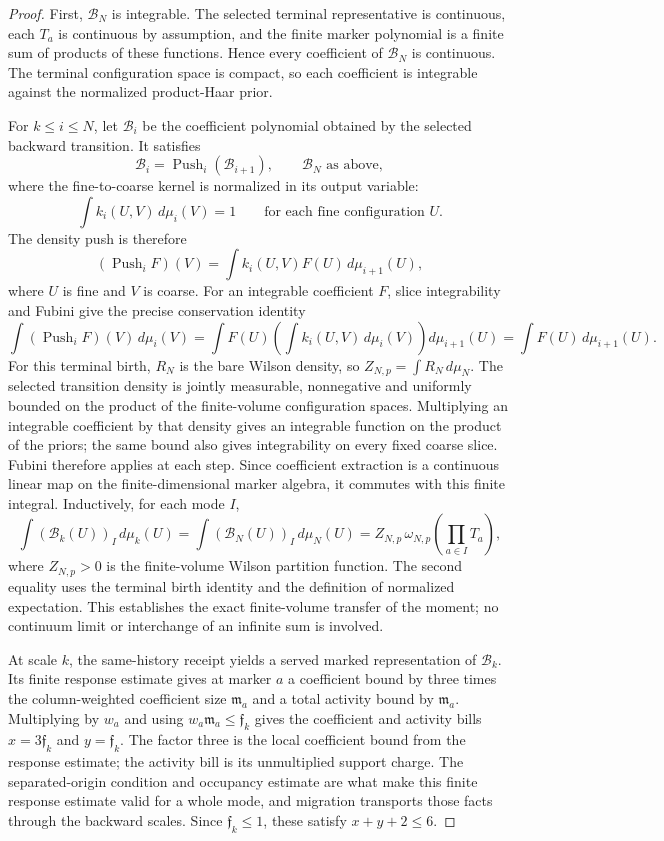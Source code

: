 \begin{proof}
First, $\mathcal B_N$ is integrable. The selected terminal representative is continuous, each $T_a$ is continuous by assumption, and the finite marker polynomial is a finite sum of products of these functions. Hence every coefficient of $\mathcal B_N$ is continuous. The terminal configuration space is compact, so each coefficient is integrable against the normalized product-Haar prior.

For $k\leq i\leq N$, let $\mathcal B_i$ be the coefficient polynomial obtained by the selected backward transition. It satisfies
\[
 \mathcal B_i=\operatorname{Push}_i(\mathcal B_{i+1}),
 \qquad \mathcal B_N\text{ as above},
\]
where the fine-to-coarse kernel is normalized in its output variable:
\[
 \int k_i(U,V)\,d\mu_i(V)=1\qquad\text{for each fine configuration }U.
\]
The density push is therefore
\[
 (\operatorname{Push}_iF)(V)=\int k_i(U,V)F(U)\,d\mu_{i+1}(U),
\]
where $U$ is fine and $V$ is coarse. For an integrable coefficient $F$, slice integrability and Fubini give the precise conservation identity
\[
 \int (\operatorname{Push}_iF)(V)\,d\mu_i(V)
 =\int F(U)\left(\int k_i(U,V)\,d\mu_i(V)\right)d\mu_{i+1}(U)
 =\int F(U)\,d\mu_{i+1}(U).
\]
For this terminal birth, $R_N$ is the bare Wilson density, so $Z_{N,p}=\int R_N\,d\mu_N$. The selected transition density is jointly measurable, nonnegative and uniformly bounded on the product of the finite-volume configuration spaces. Multiplying an integrable coefficient by that density gives an integrable function on the product of the priors; the same bound also gives integrability on every fixed coarse slice. Fubini therefore applies at each step. Since coefficient extraction is a continuous linear map on the finite-dimensional marker algebra, it commutes with this finite integral. Inductively, for each mode $I$,
\[
 \int (\mathcal B_k(U))_I\,d\mu_k(U)
 =\int (\mathcal B_N(U))_I\,d\mu_N(U)
 =Z_{N,p}\,\omega_{N,p}\!\left(\prod_{a\in I}T_a\right),
 \label{ex-selected-birth-integral}
\]
where $Z_{N,p}>0$ is the finite-volume Wilson partition function. The second equality uses the terminal birth identity and the definition of normalized expectation. This establishes the exact finite-volume transfer of the moment; no continuum limit or interchange of an infinite sum is involved.

At scale $k$, the same-history receipt yields a served marked representation of $\mathcal B_k$. Its finite response estimate gives at marker $a$ a coefficient bound by three times the column-weighted coefficient size $\mathfrak m_a$ and a total activity bound by $\mathfrak m_a$. Multiplying by $w_a$ and using $w_a\mathfrak m_a\leq\mathfrak f_k$ gives the coefficient and activity bills $x=3\mathfrak f_k$ and $y=\mathfrak f_k$. The factor three is the local coefficient bound from the response estimate; the activity bill is its unmultiplied support charge. The separated-origin condition and occupancy estimate are what make this finite response estimate valid for a whole mode, and migration transports those facts through the backward scales. Since $\mathfrak f_k\leq1$, these satisfy $x+y+2\leq6$.


\end{proof}
